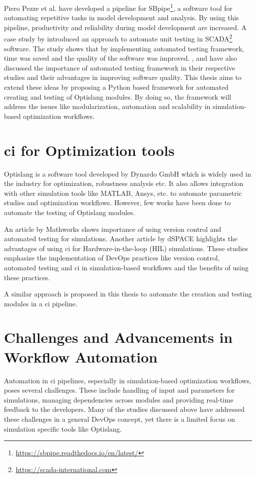 Piero Pezze et al.\cite{sbpipe} have developed a pipeline for SBpipe\footnote{\url{https://sbpipe.readthedocs.io/en/latest/}}, a software tool for automating repetitive tasks in model development and analysis. By using
this pipeline, productivity and reliability during model development are increased. A case study by \cite{6200132} introduced an approach to automate unit testing 
in SCADA\footnote{\url{https://scada-international.com}} software. The study shows that by implementing automated testing framework, time was saved and the 
quality of the software was improved. \cite{6465286}, \cite{553698} and \cite{6319254} have also discussed the importance of automated testing framework in  
their respective studies and their advantages in improving software quality. This thesis aims to extend these ideas by proposing a Python based framework for 
automated creating and testing of Optislang modules. By doing so, the framework will address the issues like modularization, automation and scalability in 
simulation-based optimization workflows.

\section{\acrlong{ci} for Optimization tools}
Optislang is a software tool developed by Dynardo GmbH which is widely used in the industry for optimization, robustness analysis etc. It also allows
integration with other simulation tools like MATLAB, Ansys, etc. to automate parametric studies and optimization workflows. However, few works have been done 
to automate the testing of Optislang modules.

An article by Mathworks \cite{mathworks} shows importance of using version control and automated testing for simulations. Another article by dSPACE \cite{dspace}
highlights the advantages of using \acrshort{ci} for Hardware-in-the-loop (HIL) simulations. These studies emphasize the implementation of DevOps practices 
like version control, automated testing and \acrshort{ci} in simulation-based workflows and the benefits of using these practices\cite{windriver}. 

A similar approach is proposed in this thesis to automate the creation and testing  modules in a \acrshort{ci} pipeline.

\section{Challenges and Advancements in Workflow Automation}
Automation in \acrshort{ci} pipelines, especially in simulation-based optimization workflows, poses several challenges. These include handling of input and parameters
for simulations, managing dependencies across modules and providing real-time feedback to the developers. Many of the studies discussed above have addressed 
these challenges in a general DevOps concept, yet there is a limited focus on simulation specific tools like Optislang.

